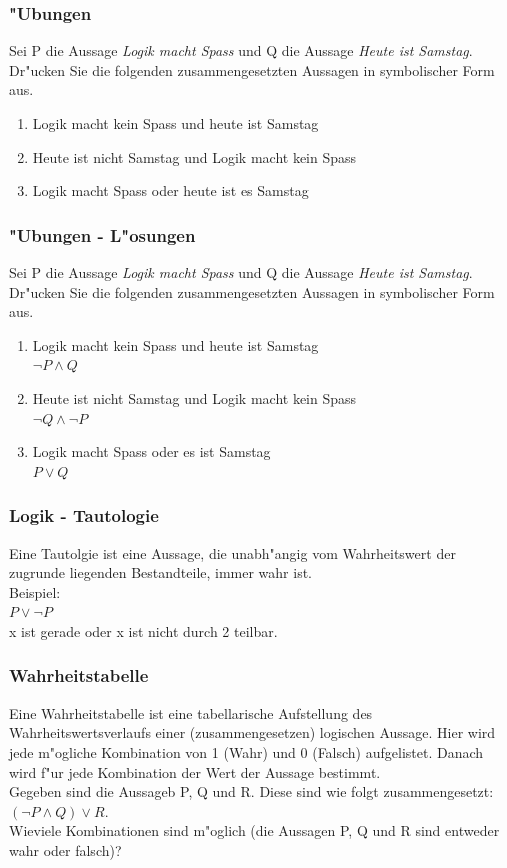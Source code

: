 \documentclass{beamer}
\begin{document}
\frame
{
	\frametitle{"Ubungen}
	Sei P die Aussage \emph{Logik macht Spass} und Q die Aussage \emph{Heute ist Samstag}.
	Dr"ucken Sie die folgenden zusammengesetzten Aussagen in symbolischer Form
	aus.
	\begin{enumerate}
	\item Logik macht kein Spass und heute ist Samstag
	\item Heute ist nicht Samstag und Logik macht kein Spass
	\item Logik macht Spass oder heute ist es Samstag
	\end{enumerate}
}

\frame
{
	\frametitle{"Ubungen - L"osungen}
	Sei P die Aussage \emph{Logik macht Spass} und Q die Aussage \emph{Heute ist Samstag}.
	Dr"ucken Sie die folgenden zusammengesetzten Aussagen in symbolischer Form
	aus.
	\begin{enumerate}
	\item Logik macht kein Spass und heute ist Samstag\\
	$\lnot P \land Q$
	\item Heute ist nicht Samstag und Logik macht kein Spass\\
	$\lnot Q \land \lnot P$
	\item Logik macht Spass oder es ist Samstag\\
	$P \lor Q$
	\end{enumerate}
}

\frame
{
	\frametitle{Logik - Tautologie}
	Eine Tautolgie ist eine Aussage, die unabh"angig vom Wahrheitswert der
	zugrunde liegenden Bestandteile, immer wahr ist.\\
	\vspace{4mm}
	Beispiel:\\
	$P \lor \lnot P$\\
	x ist gerade oder x ist nicht durch 2 teilbar.
	
}

\frame
{
	\frametitle{Wahrheitstabelle}
	Eine Wahrheitstabelle ist eine tabellarische Aufstellung des Wahrheitswertsverlaufs einer
	(zusammengesetzen) logischen Aussage. Hier wird jede m"ogliche Kombination von
	1 (Wahr) und 0 (Falsch) aufgelistet. Danach wird f"ur jede Kombination der 
	Wert der Aussage bestimmt.\\
	Gegeben sind die Aussageb P, Q und R. Diese sind wie folgt zusammengesetzt: $(\lnot P \land Q) \lor R$.\\
	Wieviele Kombinationen sind m"oglich (die Aussagen P, Q und R sind entweder wahr oder falsch)?
}
\end{document}
